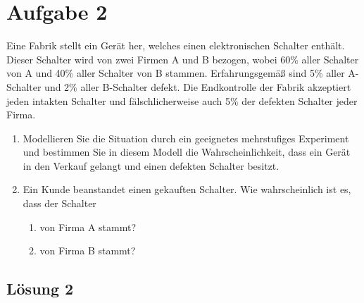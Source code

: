 \documentclass[main.tex]{subfiles}
\begin{document}
\section{Aufgabe 2}

Eine Fabrik stellt ein Gerät her, welches einen elektronischen Schalter enthält. Dieser Schalter wird von zwei Firmen A und B bezogen, wobei 60\% aller Schalter von A und 40\% aller Schalter von B stammen. Erfahrungsgemäß sind 5\% aller A-Schalter und 2\% aller B-Schalter defekt. Die Endkontrolle der Fabrik akzeptiert jeden intakten Schalter
und fälschlicherweise auch 5\% der defekten Schalter jeder Firma.
\begin{enumerate}
    \item Modellieren Sie die Situation durch ein geeignetes mehrstufiges Experiment und bestimmen Sie in diesem Modell die Wahrscheinlichkeit, dass ein Gerät in den Verkauf gelangt und einen defekten Schalter besitzt.
    \item Ein Kunde beanstandet einen gekauften Schalter. Wie wahrscheinlich ist es, dass der Schalter
    \begin{enumerate}
        \item von Firma A stammt?
        \item von Firma B stammt?
    \end{enumerate}
\end{enumerate}

\subsection{Lösung 2}
\end{document}
